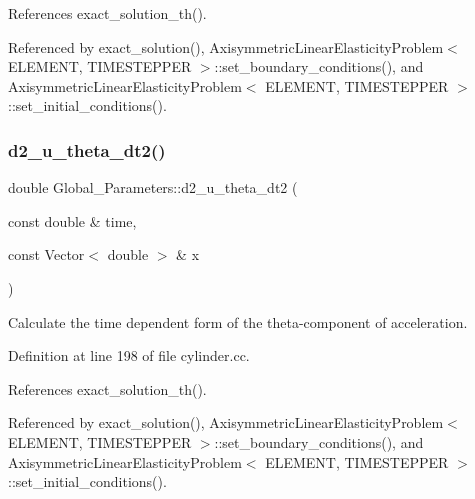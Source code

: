 References exact\+\_\+solution\+\_\+th().



Referenced by exact\+\_\+solution(), Axisymmetric\+Linear\+Elasticity\+Problem$<$ E\+L\+E\+M\+E\+N\+T, T\+I\+M\+E\+S\+T\+E\+P\+P\+E\+R $>$\+::set\+\_\+boundary\+\_\+conditions(), and Axisymmetric\+Linear\+Elasticity\+Problem$<$ E\+L\+E\+M\+E\+N\+T, T\+I\+M\+E\+S\+T\+E\+P\+P\+E\+R $>$\+::set\+\_\+initial\+\_\+conditions().

\mbox{\label{namespaceGlobal__Parameters_a902b0bba2b1393518a914330f30ee4c9}} 
\subsubsection{\texorpdfstring{d2\+\_\+u\+\_\+theta\+\_\+dt2()}{d2\_u\_theta\_dt2()}}
{\footnotesize\ttfamily double Global\+\_\+\+Parameters\+::d2\+\_\+u\+\_\+theta\+\_\+dt2 (\begin{DoxyParamCaption}\item[{const double \&}]{time,  }\item[{const Vector$<$ double $>$ \&}]{x }\end{DoxyParamCaption})}



Calculate the time dependent form of the theta-\/component of acceleration. 



Definition at line 198 of file cylinder.\+cc.



References exact\+\_\+solution\+\_\+th().



Referenced by exact\+\_\+solution(), Axisymmetric\+Linear\+Elasticity\+Problem$<$ E\+L\+E\+M\+E\+N\+T, T\+I\+M\+E\+S\+T\+E\+P\+P\+E\+R $>$\+::set\+\_\+boundary\+\_\+conditions(), and Axisymmetric\+Linear\+Elasticity\+Problem$<$ E\+L\+E\+M\+E\+N\+T, T\+I\+M\+E\+S\+T\+E\+P\+P\+E\+R $>$\+::set\+\_\+initial\+\_\+conditions().

\mbox{\label{namespaceGlobal__Parameters_a2167fee22e8f4d63a51a39ace1e3a743}} 
